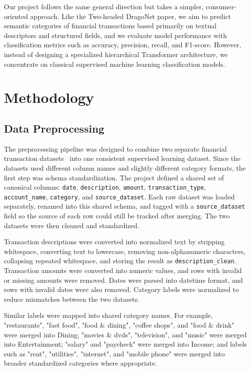 \documentclass[11pt]{article}
\begin{document}
Our project follows the same general direction but takes a simpler,
consumer-oriented approach. Like the Two-headed DragoNet paper, we
aim to predict semantic categories of financial transactions based primarily
on textual descriptors and structured fields, and we evaluate model
performance with classification metrics such as accuracy, precision, recall,
and F1-score. However, instead of designing a specialized hierarchical
Transformer architecture, we concentrate on classical supervised machine
learning classification models.

\section{Methodology}

\subsection{Data Preprocessing}

The preprocessing pipeline was designed to combine two separate financial
transaction datasets~\cite{kaggle_d1, kaggle_d2} into one consistent
supervised learning dataset. Since the datasets used different column names
and slightly different category formats, the first step was schema
standardization. The project defined a
shared set of canonical columns: \texttt{date}, \texttt{description},
\texttt{amount}, \texttt{transaction\_type}, \texttt{account\_name},
\texttt{category}, and \texttt{source\_dataset}. Each raw dataset was loaded
separately, renamed into this shared schema, and tagged with a
\texttt{source\_dataset} field so the source of each row could still be
tracked after merging. The two datasets were then cleaned and standardized.

Transaction descriptions were converted into normalized text by stripping
whitespace, converting text to lowercase, removing non-alphanumeric
characters, collapsing repeated whitespace, and storing the result as
\texttt{description\_clean}. Transaction amounts were converted into numeric
values, and rows with invalid or missing amounts were removed. Dates were
parsed into datetime format, and rows with invalid dates were also removed.
Category labels were normalized to reduce mismatches between the two
datasets.

Similar labels were mapped into shared category names. For example,
"restaurants", "fast food", "food \& dining", "coffee shops", and
"food \& drink" were merged into Dining; "movies \& dvds", "television",
and "music" were merged into Entertainment; "salary" and "paycheck" were
merged into Income; and labels such as "rent", "utilities", "internet",
and "mobile phone" were merged into broader standardized categories where
appropriate.
\end{document}

